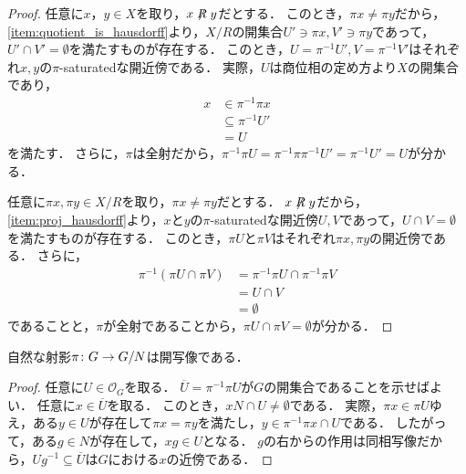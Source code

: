 \documentclass{jlreq}
\begin{document}
\begin{proof}
  \implyheading{\ref{item:quotient_is_hausdorff}}{\ref{item:proj_hausdorff}}
  任意に$x，y \in X$を取り，$x \not\mathrel{R} y$だとする．
  このとき，$\pi x \ne \pi y$だから，\cref{item:quotient_is_hausdorff}より，$X/R$の開集合$U' \ni \pi x, V' \ni \pi y$であって，$U' \cap V' = \emptyset$を満たすものが存在する．
  このとき，$U = \pi^{-1} U', V = \pi^{-1} V'$はそれぞれ$x, y$の$\pi$-saturatedな開近傍である．
  実際，$U$は商位相の定め方より$X$の開集合であり，
  \begin{align}
    x & \in \pi^{-1} \pi x    \\
      & \subseteq \pi^{-1} U' \\
      & = U
  \end{align}
  を満たす．
  さらに，$\pi$は全射だから，$\pi^{-1} \pi U = \pi^{-1} \pi \pi^{-1} U' = \pi^{-1} U' = U$が分かる．

  \implyheading{\ref{item:proj_hausdorff}}{\ref{item:quotient_is_hausdorff}}
  任意に$\pi x, \pi y \in X/R$を取り，$\pi x \ne \pi y$だとする．
  $x \not\mathrel{R} y$だから，\cref{item:proj_hausdorff}より，$x$と$y$の$\pi$-saturatedな開近傍$U, V$であって，$U \cap V = \emptyset$を満たすものが存在する．
  このとき，$\pi U$と$\pi V$はそれぞれ$\pi x, \pi y$の開近傍である．
  さらに，
  \begin{align}
    \pi^{-1} (\pi U \cap \pi V) & = \pi^{-1} \pi U \cap \pi^{-1} \pi V \\
                                & = U \cap V                           \\
                                & = \emptyset
  \end{align}
  であることと，$\pi$が全射であることから，$\pi U \cap \pi V = \emptyset$が分かる．
\end{proof}

\begin{lemma}\label{prop:proj_is_open}
  自然な射影$\pi \colon G \to G/N$は開写像である．
\end{lemma}

\begin{proof}
  任意に$U \in \mathcal{O}_G$を取る．
  $\overline{U} = \pi^{-1} \pi U$が$G$の開集合であることを示せばよい．
  任意に$x \in \overline{U}$を取る．
  このとき，$xN \cap U \ne \emptyset$である．
  実際，$\pi x \in \pi U$ゆえ，ある$y \in U$が存在して$\pi x = \pi y$を満たし，$y \in \pi^{-1} \pi x \cap U$である．
  したがって，ある$g \in N$が存在して，$xg \in U$となる．
  $g$の右からの作用は同相写像だから，$Ug^{-1} \subseteq \overline{U}$は$G$における$x$の近傍である．
\end{proof}
\end{document}

